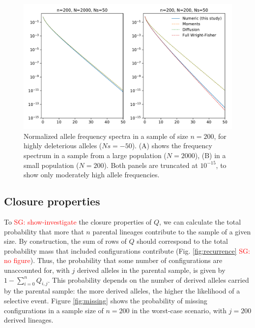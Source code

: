 \documentclass[review]{elsarticle}
\newcommand{\sgcomment}[1]{\textcolor{red}{SG: #1}}
\begin{document}
\begin{figure}
  \centering
  \includegraphics[width=0.7\textheight]{fig/strong_selection.pdf}
  \caption{Normalized allele frequency spectra in a sample of size $n=200$, for highly deleterious
    alleles ($Ns=-50$). (A) shows the frequency spectrum in a sample from a large population
    ($N=2000$), (B) in a small population ($N=200$). Both panels are truncated at $10^{-15}$, to
    show only moderately high allele frequencies.}
  \label{fig:strong-selection}
\end{figure}


\subsection{Closure properties}
\label{subsec:closure}

To \sgcomment{show-investigate} the closure properties of $Q$, we can calculate the total
probability that more that $n$ parental lineages contribute to the sample of a given size. By
construction, the sum of rows of $Q$ should correspond to the total probability mass that included
configurations contribute (Fig. \ref{fig:recurrence} \sgcomment{no figure}). Thus, the probability
that some number of configurations are unaccounted for, with $j$ derived alleles in the parental
sample, is given by $1-\sum_{i=0}^{n}Q_{i,j}$. This probability depends on the number of derived
alleles carried by the parental sample: the more derived alleles, the higher the likelihood of a
selective event. Figure \ref{fig:missing} shows the probability of missing configurations in a
sample size of $n=200$ in the worst-case scenario, with $j=200$ derived lineages.
\end{document}
